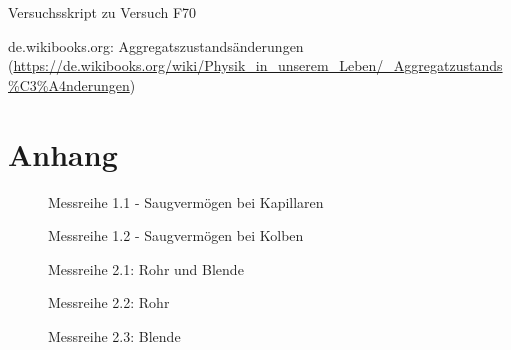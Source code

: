 \documentclass[12pt, a4paper]{scrartcl}
\begin{document}
	\newpage 
	
	\begin{thebibliography}{00}   %
		
		 Versuchsskript zu Versuch F70
		
		 de.wikibooks.org: Aggregatszustandsänderungen\\ (\url{https://de.wikibooks.org/wiki/Physik_in_unserem_Leben/_Aggregatzustands%C3%A4nderungen})
		
	\end{thebibliography}
	
    \newpage
    \section{Anhang}
    
    \begin{figure}[H]
        \centering
        
        \caption{Messreihe 1.1 - Saugvermögen bei Kapillaren}
        \label{m11}
    \end{figure}

   	\begin{figure}[H]
        \centering
        
        \caption{Messreihe 1.2 - Saugvermögen bei Kolben}
        \label{m12}
    \end{figure}

    \begin{figure}[H]
        \centering
        
        \caption{Messreihe 2.1: Rohr und Blende}
        \label{m21}
    \end{figure}

    \begin{figure}[H]
        \centering
        
        \caption{Messreihe 2.2: Rohr}
        \label{m22}
    \end{figure}

    \begin{figure}[H]
        \centering
        
        \caption{Messreihe 2.3: Blende}
        \label{m23}
    \end{figure} 
\end{document}

